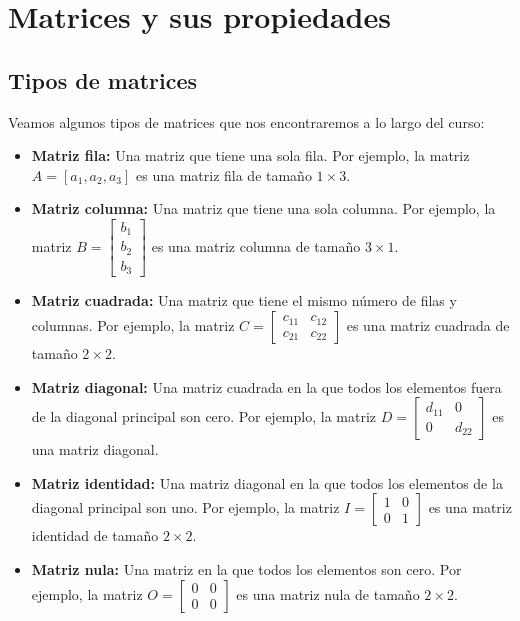 \section{Matrices y sus propiedades}
\subsection{Tipos de matrices}

Veamos algunos tipos de matrices que nos encontraremos a lo largo del curso:
\begin{definición}
    \begin{itemize}
        \item \textbf{Matriz fila:} Una matriz que tiene una sola fila. Por ejemplo, la matriz \( A = [a_1, a_2, a_3] \) es una matriz fila de tamaño \( 1 \times 3 \).
        \item \textbf{Matriz columna:} Una matriz que tiene una sola columna. Por ejemplo, la matriz \( B = \begin{bmatrix} b_1 \\ b_2 \\ b_3 \end{bmatrix} \) es una matriz columna de tamaño \( 3 \times 1 \).
        \item \textbf{Matriz cuadrada:} Una matriz que tiene el mismo número de filas y columnas. Por ejemplo, la matriz \( C = \begin{bmatrix} c_{11} & c_{12} \\ c_{21} & c_{22} \end{bmatrix} \) es una matriz cuadrada de tamaño \( 2 \times 2 \).
        \item \textbf{Matriz diagonal:} Una matriz cuadrada en la que todos los elementos fuera de la diagonal principal son cero. Por ejemplo, la matriz \( D = \begin{bmatrix} d_{11} & 0 \\ 0 & d_{22} \end{bmatrix} \) es una matriz diagonal.
        \item \textbf{Matriz identidad:} Una matriz diagonal en la que todos los elementos de la diagonal principal son uno. Por ejemplo, la matriz \( I = \begin{bmatrix} 1 & 0 \\ 0 & 1 \end{bmatrix} \) es una matriz identidad de tamaño \( 2 \times 2 \).
        \item \textbf{Matriz nula:} Una matriz en la que todos los elementos son cero. Por ejemplo, la matriz \( O = \begin{bmatrix} 0 & 0 \\ 0 & 0 \end{bmatrix} \) es una matriz nula de tamaño \( 2 \times 2 \).

\end{itemize}
\end{definición}
